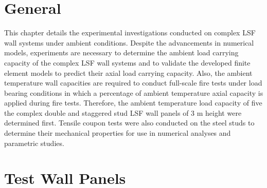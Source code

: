 \section{General}

This chapter details the experimental investigations conducted on complex LSF wall systems under ambient conditions. Despite the advancements in numerical models, experiments are necessary to determine the ambient load carrying capacity of the complex LSF wall systems and to validate the developed finite element models to predict their axial load carrying capacity. Also, the ambient temperature wall capacities are required to conduct full-scale fire tests under load bearing conditions in which a percentage of ambient temperature axial capacity is applied during fire tests. Therefore, the ambient temperature load capacity of five the complex double and staggered stud LSF wall panels of 3 m height were determined first. Tensile coupon tests were also conducted on the steel studs to determine their mechanical properties for use in numerical analyses and parametric studies.  

\section{Test Wall Panels}

